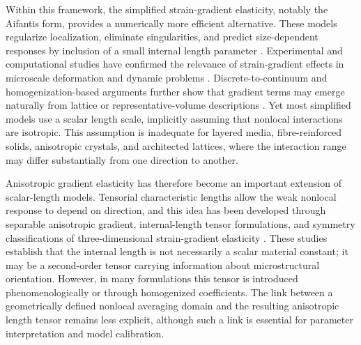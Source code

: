 \documentclass[final,3p,times,fleqn]{elsarticle}
\begin{document}
Within this framework, the simplified strain-gradient elasticity, notably the Aifantis form, provides a numerically more efficient alternative. These models regularize localization, eliminate singularities, and predict size-dependent responses by inclusion of a small internal length parameter \cite{Aifantis1992,RuAifantis1993,AltanAifantis1997}. 
Experimental and computational studies have confirmed the relevance of strain-gradient effects in microscale deformation and dynamic problems \cite{Lam2003,AskesAifantis2011}. Discrete-to-continuum and homogenization-based arguments further show that gradient terms may emerge naturally from lattice or representative-volume descriptions \cite{MetrikineAskes2002,Gitman2005}. Yet most simplified models use a scalar length scale, implicitly assuming that nonlocal interactions are isotropic. This assumption is inadequate for layered media, fibre-reinforced solids, anisotropic crystals, and architected lattices, where the interaction range may differ substantially from one direction to another.

Anisotropic gradient elasticity has therefore become an important extension of scalar-length models. Tensorial characteristic lengths allow the weak nonlocal response to depend on direction, and this idea has been developed through separable anisotropic gradient, internal-length tensor formulations, and symmetry classifications of three-dimensional strain-gradient elasticity \cite{LazarPo2015,Polizzotto2018,Auffray2019}. These studies establish that the internal length is not necessarily a scalar material constant; it may be a second-order tensor carrying information about microstructural orientation. However, in many formulations this tensor is introduced phenomenologically or through homogenized coefficients. The link between a geometrically defined nonlocal averaging domain and the resulting anisotropic length tensor remains less explicit, although such a link is essential for parameter interpretation and model calibration.
\end{document}
